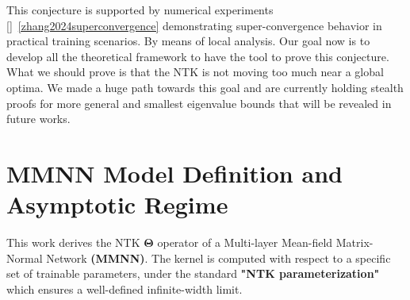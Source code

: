 \documentclass[a4paper]{article}
\theoremstyle{plain}
\theoremstyle{definition}
\theoremstyle{remark}
\begin{document}
This conjecture is supported by numerical experiments []~\ref{zhang2024superconvergence} demonstrating super-convergence behavior in practical training scenarios.
By means of local analysis. Our goal now is to develop all the theoretical framework to have the tool to prove this conjecture. 
What we should prove is that the NTK is not moving too much near a global optima. We made a huge path towards this goal and are currently
holding stealth proofs for more general and smallest eigenvalue bounds that will be revealed in future works.


\newpage

\section{MMNN Model Definition and Asymptotic Regime}

\begin{tcolorbox}[colback=green!15,colframe=green!80!black,title={\textbf{Objective and Scope}},enhanced,drop shadow,boxrule=2pt]
This work derives the NTK $\boldsymbol{\Theta}$ operator of a Multi-layer Mean-field Matrix-Normal Network \textbf{(MMNN)}. 
The kernel is computed with respect to a specific set of trainable parameters, under the standard \textbf{"NTK parameterization"} 
which ensures a well-defined infinite-width limit.
\end{tcolorbox}
\end{document}
